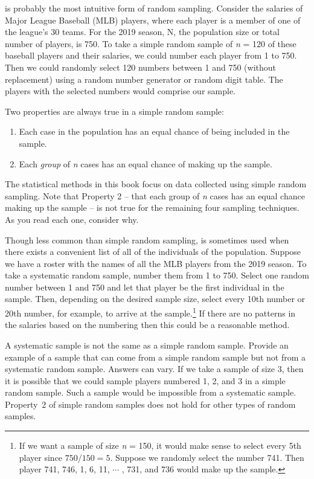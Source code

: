  is probably the most intuitive form of random sampling. Consider the salaries of Major League Baseball (MLB) players, where each player is a member of one of the league's 30 teams. For the 2019 season, N, the population size or total number of players, is 750. To take a simple random sample of \textit{n} = 120 of these baseball players and their salaries, we could number each player from 1 to 750. Then we could randomly select 120 numbers between 1 and 750 (without replacement) using a random number generator or random digit table. The players with the selected numbers would comprise our sample.

Two properties are always true in a simple random sample:
\begin{enumerate}
\item Each case in the population has an equal chance of being included in the sample.
\item Each \emph{group} of \textit{n} cases has an equal chance of making up the sample.
\end{enumerate}

The statistical methods in this book focus on data collected using simple random sampling. Note that Property 2 -- that each group of \textit{n} cases has an equal chance making up the sample -- is not true for the remaining four sampling techniques. As you read each one, consider why.

Though less common than simple random sampling,  is sometimes used when there exists a convenient list of all of the individuals of the population. Suppose we have a roster with the names of all the MLB players from the 2019 season. To take a systematic random sample, number them from 1 to 750. Select one random number between 1 and 750 and let that player be the first individual in the sample. Then, depending on the desired sample size, select every 10th number or 20th number, for example, to arrive at the sample.\footnote{If we want a sample of size \textit{n} = 150, it would make sense to select every 5th player since \mbox{$750/150 = 5$.} Suppose we randomly select the number 741. Then player 741, 746, 1, 6, 11, $\cdots$ , 731, and 736 would make up the sample.} If there are no patterns in the salaries based on the numbering then this could be a reasonable method.

\begin{examplewrap}
\begin{nexample}{A systematic sample is not the same as a simple random sample. Provide an example of a sample that can come from a simple random sample but not from a systematic random sample.}
Answers can vary. If we take a sample of size 3, then it is possible that we could sample players numbered 1, 2, and 3 in a simple random sample. Such a sample would be impossible from a systematic sample. Property~2 of simple random samples does not hold for other types of random samples.
\end{nexample}
\end{examplewrap}

